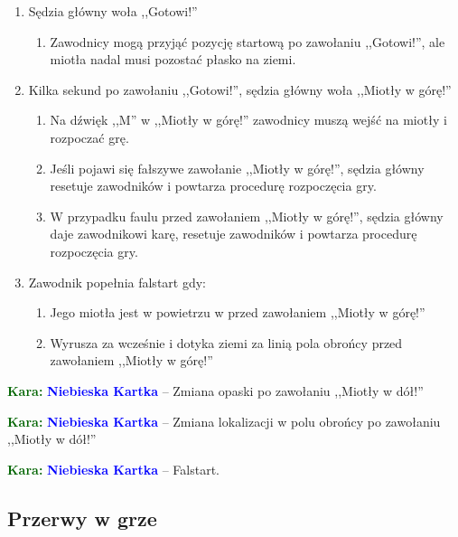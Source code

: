 \documentclass[11pt,a4paper]{article}
\newcommand\bluecard[1]{\bgroup\textcolor{darkgreen}{\textbf{Kara: }}\bgroup\textcolor{blue}{\textbf{Niebieska Kartka}} -- #1}
\begin{document}
\begin{enumerate}
\begin{enumerate}
\begin{enumerate}
    \end{enumerate}
  \end{enumerate}
  \item Sędzia główny woła ,,Gotowi!''
  \begin{enumerate}
    \item Zawodnicy mogą przyjąć pozycję startową po zawołaniu ,,Gotowi!'', ale miotła nadal musi pozostać płasko na ziemi.
  \end{enumerate}
  \item Kilka sekund po zawołaniu ,,Gotowi!'', sędzia główny woła ,,Miotły w górę!''
  \begin{enumerate}
    \item Na dźwięk ,,M'' w ,,Miotły w górę!'' zawodnicy muszą wejść na miotły i rozpoczać grę.
    \item Jeśli pojawi się fałszywe zawołanie ,,Miotły w górę!'', sędzia główny resetuje zawodników i powtarza procedurę rozpoczęcia gry.
    \item W przypadku faulu przed zawołaniem ,,Miotły w górę!'', sędzia główny daje zawodnikowi karę, resetuje zawodników i powtarza procedurę rozpoczęcia gry.
  \end{enumerate}
  \item Zawodnik popełnia falstart gdy:
  \begin{enumerate}
    \item Jego miotła jest w powietrzu w przed zawołaniem ,,Miotły w górę!''
    \item Wyrusza za wcześnie i dotyka ziemi za linią pola obrońcy przed zawołaniem ,,Miotły w górę!''
  \end{enumerate}
\end{enumerate}

\bluecard{Zmiana opaski po zawołaniu ,,Miotły w dół!''}

\bluecard{Zmiana lokalizacji w polu obrońcy po zawołaniu ,,Miotły w dół!''}

\bluecard{Falstart.}

\subsection{Przerwy w grze}
\end{document}

